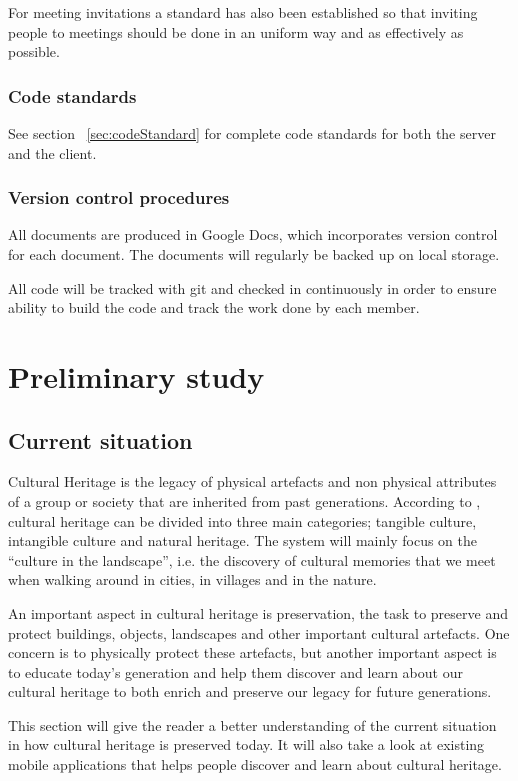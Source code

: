\documentclass[11pt]{book}
\begin{document}
For meeting invitations a standard has also been established so that inviting people to meetings should be done in an uniform way and as effectively as possible.

\subsection{Code standards}
See section ~\ref{sec:codeStandard} for complete code standards for both the server and the client.

\subsection{Version control procedures}
All documents are produced in Google Docs, which incorporates version control for each document. The documents will regularly be backed up on local storage.

All code will be tracked with git and checked in continuously in order to ensure ability to build the code and track the work done by each member.

\chapter{Preliminary study}
\label{chap:preliminary_study}

\section{Current situation}
Cultural Heritage is the legacy of physical artefacts and non physical attributes of a group or society that are inherited from past generations. According to \cite{CiD:culturalheritage}, cultural heritage can be divided into three main categories; tangible culture, intangible culture and natural heritage. The system will mainly focus on the ``culture in the landscape'', i.e. the discovery of cultural memories that we meet when walking around in cities, in villages and in the nature.

An important aspect in cultural heritage is preservation, the task to preserve and protect buildings, objects, landscapes and other important cultural artefacts. One concern is to physically protect these artefacts, but another important aspect is to educate today's generation and help them discover and learn about our cultural heritage to both enrich and preserve our legacy for future generations.

This section will give the reader a better understanding of the current situation in how cultural heritage is preserved today. It will also take a look at existing mobile applications that helps people discover and learn about cultural heritage.
\end{document}

